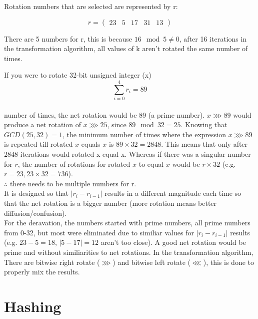 \documentclass[fleqn, a4paper,12pt]{article}
\begin{document}
Rotation numbers that are selected are represented by r:

\[
r = 
\begin{pmatrix}
		23 & 5 & 17 & 31 & 13
\end{pmatrix}
\]

There are 5 numbers for r, this is because $16 \mod 5 \neq 0$, after 16 iterations in the transformation algorithm, all values of k aren't rotated the same number of times.

If you were to rotate 32-bit unsigned integer (x)
\[
\sum_{i=0}^4 r_i = 89
\]
\\
number of times, the net rotation would be 89 (a prime number). $x \ggg 89$ would produce a net rotation of $x \ggg 25$, since $89 \mod 32=25$. Knowing that $GCD(25, 32) = 1$, the minimum number of times where the expression $x \ggg 89$ is repeated till rotated $x$ equals $x$ is $89 \times 32 = 2848$. This means that only after $2848$ iterations would rotated x equal x. Whereas if there was a singular number for $r$, the number of rotations for rotated $x$ to equal $x$ would be $r \times 32$ (e.g. $r=23, 23 \times 32 = 736$). \\

$\therefore$ there needs to be multiple numbers for r.
\\
It is designed so that $|r_i - r_{i-1}|$ results in a different magnitude each time so that the net rotation is a bigger number (more rotation means better diffusion/confusion).
\\
For the deravation, the numbers started with prime numbers, all prime numbers from 0-32, but most were eliminated due to similiar values for  $|r_i - r_{i-1}|$ results (e.g. $23-5=18$, $|5-17|=12$ aren't too close). A good net rotation would be prime and without similiarities to net rotations. In the transformation algorithm, There are bitwise right rotate ($\ggg$) and bitwise left rotate ($\lll$), this is done to properly mix the results.

\section{Hashing}
\end{document}
